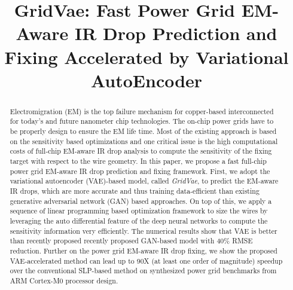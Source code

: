 \documentclass[journal]{IEEEtran}
\begin{document}
\title{GridVae: Fast Power Grid EM-Aware IR Drop Prediction and Fixing
  Accelerated by Variational AutoEncoder}



\maketitle
  
\begin{abstract}
  Electromigration (EM) is the top failure mechanism for copper-based
  interconnected for today's and future nanometer chip technologies.
  The on-chip power grids have to be properly design to ensure the EM
  life time. Most of the existing approach is based on the sensitivity
  based optimizations and one critical issue is the high computational
  costs of full-chip EM-aware IR drop analysis to compute the
  sensitivity of the fixing target with respect to the wire
  geometry. In this paper, we propose a fast full-chip power grid
  EM-aware IR drop prediction and fixing framework. First, we adopt
  the variational autoencoder (VAE)-based model, called {\it GridVae},
  to predict the EM-aware IR drops, which are more accurate and thus
  training data-efficient than existing generative adversarial network
  (GAN) based approaches. On top of this, we apply a sequence of
  linear programming based optimization framework to size the wires by
  leveraging the auto differential feature of the deep neural networks
  to compute the sensitivity information very efficiently.  The
  numerical results show that VAE is better than recently proposed
  recently proposed GAN-based model with 40$\%$ RMSE reduction.
  Further on the power grid EM-aware IR drop fixing, we show the
  proposed VAE-accelerated method can lead up to 90X (at least one
  order of magnitude) speedup over the conventional SLP-based method
  on synthesized power grid benchmarks from ARM Cortex-M0 processor
  design.

\end{abstract}
 





\end{document}
